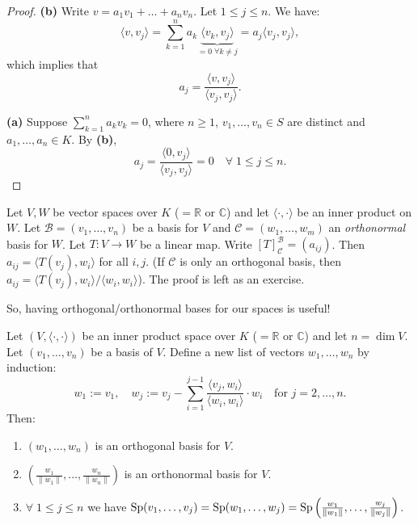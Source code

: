 \begin{proof}
    \textbf{(b)} Write $v = a_1 v_1 + \dots + a_n v_n$. Let $1 \leq j \leq n$. We have:
    \[
        \langle v, v_j \rangle = \sum_{k=1}^n a_k \underbrace{\langle v_k, v_j \rangle}_{= 0 \; \forall k \neq j} = a_j \langle v_j, v_j \rangle,
    \]
    which implies that
    \[
        a_j = \frac{\langle v, v_j \rangle}{\langle v_j, v_j \rangle}.
    \]
    
    \textbf{(a)} Suppose $\sum_{k=1}^n a_k v_k = 0$, where $n \geq 1$, $v_1, \dots, v_n \in S$ are distinct and $a_1, \dots, a_n \in K$. By \textbf{(b)},
    \[
        a_j = \frac{\langle 0, v_j \rangle}{\langle v_j, v_j \rangle} = 0 \quad \forall \; 1 \leq j \leq n.
    \]
\end{proof}

\begin{proposition}
\label{prop:matrix_representation_orthonormal}
    Let $V, W$ be vector spaces over $K$ ($= \mathbb{R}$ or $\mathbb{C}$) and let $\langle \cdot, \cdot \rangle$ be an inner product on $W$. Let $\mathcal{B} = (v_1, \dots, v_n)$ be a basis for $V$ and $\mathcal{C} = (w_1, \dots, w_m)$ an \emph{orthonormal} basis for $W$. Let $T: V \to W$ be a linear map. Write $[T]_{\mathcal{C}}^{\mathcal{B}} = (a_{ij})$. Then $a_{ij} = \langle T(v_j), w_i \rangle$ for all $i,j$. 
    (If $\mathcal{C}$ is only an orthogonal basis, then $a_{ij} = \langle T(v_j), w_i \rangle / \langle w_i, w_i \rangle$).
    The proof is left as an exercise.
\end{proposition}

So, having orthogonal/orthonormal bases for our spaces is useful!

\begin{theorem}
\label{thm:gram_schmidt}
    Let $(V, \langle \cdot, \cdot \rangle)$ be an inner product space over $K$ ($= \mathbb{R}$ or $\mathbb{C}$) and let $n = \dim V$. Let $(v_1, \dots, v_n)$ be a basis of $V$. Define a new list of vectors $w_1, \dots, w_n$ by induction:
    \[
        w_1 := v_1, \quad w_j := v_j - \sum_{i=1}^{j-1} \frac{\langle v_j, w_i \rangle}{\langle w_i, w_i \rangle} \cdot w_i \quad \text{for } j = 2, \dots, n.
    \]
    Then:
    \begin{enumerate}[label=\textbf{(\alph*)}]
        \item $(w_1, \dots, w_n)$ is an orthogonal basis for $V$.
        \item $\left( \frac{w_1}{\|w_1\|}, \dots, \frac{w_n}{\|w_n\|} \right)$ is an orthonormal basis for $V$.
        \item $\forall \; 1 \leq j \leq n$ we have $\operatorname{Sp}(v_1, \dots, v_j) = \operatorname{Sp}(w_1, \dots, w_j) = \operatorname{Sp}\left(\frac{w_1}{\|w_1\|}, \dots, \frac{w_j}{\|w_j\|}\right)$.
    \end{enumerate}
\end{theorem}

